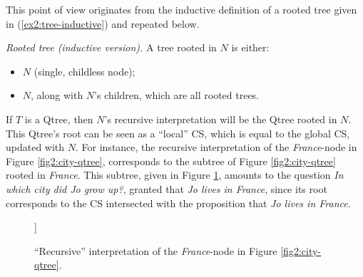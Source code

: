 This point of view originates from the inductive definition of a rooted tree given in (\ref{ex2:tree-inductive}) and repeated below.

\begin{exe}
	 {\textit{Rooted tree (inductive version).} A tree rooted in $N$ is either:
		\begin{itemize}
			\item $N$ (single, childless node);
			\item $N$, along with $N$'s children, which are all rooted trees.
	\end{itemize}}
\end{exe}

If $T$ is a Qtree, then $N$'s recursive interpretation will be the Qtree rooted in $N$. This Qtree's root can be seen as a ``local'' CS, which is equal to the global CS, updated with $N$. For instance, the recursive interpretation of the \textit{France}-node in Figure \ref{fig2:city-qtree}, corresponds to the subtree of Figure \ref{fig2:city-qtree} rooted in \textit{France}. This subtree, given in Figure \ref{fig2:france-subtree}, amounts to the question \textit{In which city did Jo grow up?}, granted that \textit{Jo lives in France}, since its root corresponds to the CS intersected with the proposition that \textit{Jo lives in France}.

\begin{figure}[H]
	\centering
	\begin{forest}
		[\textcolor{blue}{France}[\textcolor{orange}{{Paris}}][\textcolor{orange}{Lyon}][\textcolor{orange}{...}]]
	\end{forest}
	\caption{``Recursive'' interpretation of the \textit{France}-node in Figure \ref{fig2:city-qtree}.}\label{fig2:france-subtree}
\end{figure}

